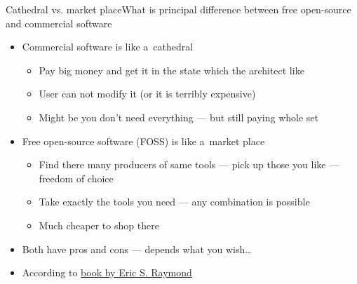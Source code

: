 \documentclass[compress, ucs, xelatex, 11pt, xcolor=svgnames, aspectratio=169,
	hyperref={
		bookmarks=true,
		unicode=true,
		colorlinks=true,
		pdftitle={Linux, command line and MetaCentrum},
		plainpages=false,
		pdfauthor={Vojtech Zeisek},
		pdfsubject={Course about use of Linux command line, writing shell scripts and using MetaCentrum of CESNET},
		pdfcreator={XeLaTeX},
		pdfkeywords={Linux, GNU, BASH, shell, command line, MetaCentrum},
		linkcolor=DarkRed, %
		anchorcolor=DarkBlue, %
		citecolor=Indigo, %
		filecolor=NavyBlue, %
		menucolor=DarkMagenta, %
		urlcolor=DarkBlue, %
		pdftex},
	url={hyphens, lowtilde} %
	]{beamer}
\begin{document}
\begin{frame}{Cathedral vs. market place}{What is principal difference between free open-source and commercial software}
	\begin{itemize}
		\item Commercial software is like a~cathedral
		\begin{itemize}
			\item Pay big money and get it in the state which the architect like
			\item User can not modify it (or it is terribly expensive)
			\item Might be you don't need everything --- but still paying whole set
		\end{itemize}
		\item Free open-source software (FOSS) is like a~market place
		\begin{itemize}
			\item Find there many producers of same tools --- pick up those you like --- freedom of choice
			\item Take exactly the tools you need --- any combination is possible
			\item Much cheaper to shop there
		\end{itemize}
		\item Both have pros and cons --- depends what you wish\ldots
		\item According to \href{https://en.wikipedia.org/wiki/The_Cathedral_and_the_Bazaar}{book by Eric S. Raymond}
	\end{itemize}
\end{frame}
\end{document}
